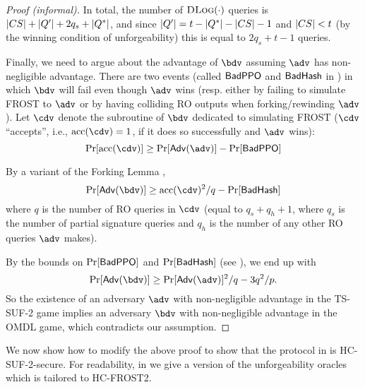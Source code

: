 \begin{proof}[Proof (informal)]
In total, the number of $\textsc{DLog}(\cdot)$ queries is $\lvert {\ensuremath{CS}} \rvert + \lvert Q' \rvert + 2q_s + \lvert Q^* \rvert$, and since $\lvert Q' \rvert = t - \lvert Q^* \rvert - \lvert CS \rvert - 1$ and $\lvert CS \rvert < t$ (by the winning condition of unforgeability) this is equal to $2q_s + t - 1$ queries.

Finally, we need to argue about the advantage of $\bdv$ assuming $\adv$ has non-negligible advantage. There are two events (called $\sf BadPPO$ and $\sf BadHash$ in \cite{C:BCKMTZ22}) in which $\bdv$ will fail even though $\adv$ wins (resp. either by failing to simulate FROST to $\adv$ or by having colliding RO outputs when forking/rewinding $\adv$). Let $\cdv$ denote the subroutine of $\bdv$ dedicated to simulating FROST ($\cdv$ ``accepts'', i.e., $\text{acc}(\cdv) = 1$, if it does so successfully and $\adv$ wins):
\def\acc{\text{acc}}
\def\Adv{\ensuremath{\mathsf{Adv}}}
\[
\Pr[\acc(\cdv)] \geq \Pr[\Adv(\adv)] - \Pr[{\sf BadPPO}]
\]

By a variant of the Forking Lemma \cite[Lemma 5.3]{C:BCKMTZ22}, 
\[
\Pr[\Adv(\bdv)] \geq \acc(\cdv)^2/q - \Pr[{\sf BadHash}]
\]
where $q$ is the number of RO queries in $\cdv$ (equal to $q_s + q_h + 1$, where $q_s$ is the number of partial signature queries and $q_h$ is the number of any other RO queries $\adv$ makes). 

By the bounds on $\Pr[{\sf BadPPO}]$ and $\Pr[{\sf BadHash}]$ (see \cite{C:BCKMTZ22}), we end up with
\[
\Pr[\Adv(\bdv)] \geq \Pr[\Adv(\adv)]^2/q - 3q^2/p.
\]
So the existence of an adversary $\adv$ with non-negligible advantage in the TS-SUF-2 game implies an adversary $\bdv$ with non-negligible advantage in the OMDL game, which contradicts our assumption.
\end{proof}

We now show how to modify the above proof to show that the protocol in  is HC-SUF-2-secure. For readability, in  we give a version of the unforgeability oracles which is tailored to HC-FROST2.


